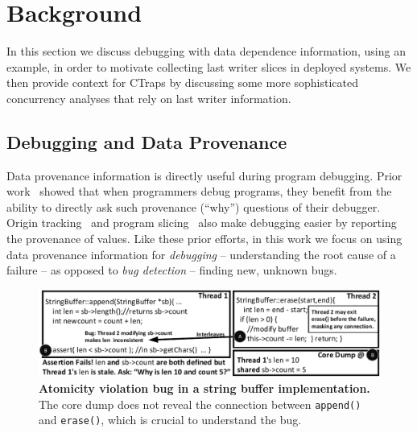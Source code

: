 \documentclass[preprint,9pt]{sigplanconf}
\newcommand{\ctraps}{CTraps\xspace}
\begin{document}
\section{Background}

In this section we discuss debugging with data dependence information, using an
example, in order to motivate collecting last writer slices in deployed
systems.  We then provide context for \ctraps by discussing some more
sophisticated concurrency analyses that rely on last writer information.


\subsection{Debugging and Data Provenance}

Data provenance information is directly useful during program debugging.  Prior
work~\cite{whylinechi,whylineicse} showed that when programmers debug
programs, they benefit from the ability to directly ask such provenance
(``why'') questions of their debugger.  Origin tracking~\cite{badapples} and
program slicing~\cite{tipslicingsurvey} also make debugging easier by reporting
the provenance of values.  Like these prior efforts, in this work we focus on
using data provenance information for {\em debugging} -- understanding the root
cause of a failure -- as opposed to {\em bug detection} -- finding new, unknown
bugs.

\begin{figure}[h]
\centering
\includegraphics[width=\columnwidth]{figs/JDKStringBufferFail.pdf}
\caption{\label{fig:coreDumpFail}{\bf Atomicity violation bug in a string buffer implementation.} The core dump does not reveal the connection between {\tt append()} and {\tt erase()}, which is crucial to understand the bug.}
\end{figure}
\end{document}
